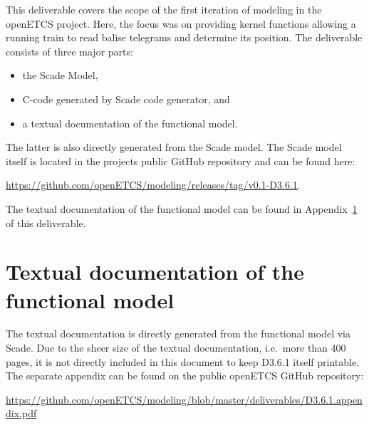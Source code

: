 \documentclass{template/openetcs_report}
\begin{document}
This deliverable covers the scope of the first iteration of modeling in the openETCS project. Here, the focus was on providing kernel functions allowing a running train to read balise telegrams and determine its position. The deliverable consists of three major parts:
\begin{itemize}
\item the Scade Model, 
\item C-code generated by Scade code generator, and
\item a textual documentation of the functional model.
\end{itemize}
The latter is also directly generated from the Scade model. The Scade model itself is located in the projects public GitHub repository and can be found here:

\url{https://github.com/openETCS/modeling/releases/tag/v0.1-D3.6.1}.

The textual documentation of the functional model can be found in Appendix~\ref{a:textual} of this deliverable.

\appendix

\chapter{Textual documentation of the functional model}\label{a:textual}
The textual documentation is directly generated from the functional model via Scade. Due to the sheer size of the textual documentation, i.e.~more than 400 pages, it is not directly included in this document to keep D3.6.1 itself printable. The separate appendix can be found on the public openETCS GitHub repository:

\url{https://github.com/openETCS/modeling/blob/master/deliverables/D3.6.1.appendix.pdf}
\end{document}
